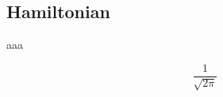 \subsection{Hamiltonian}
\begin{example}{aaa}

\end{example}

\begin{equation}
\frac{1}{\sqrt{2\pi}}~
\end{equation}